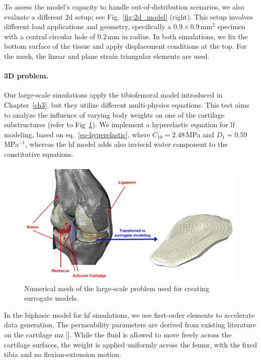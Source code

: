 \documentclass[12pt,a4paper]{report}
\begin{document}
To assess the model's capacity to handle out-of-distribution scenarios, we also evaluate a different \ac{2d} setup; see Fig.~\ref{fig:2d_model} (right). This setup involves different load applications and geometry, specifically a $0.9 \times 0.9$\,mm$^2$ specimen with a central circular hole of $0.2$\,mm in radius. In both simulations, we fix the bottom surface of the tissue and apply displacement conditions at the top. For the mesh, the linear and plane strain triangular elements are used.

\paragraph{3D problem.} Our large-scale simulations apply the tibiofemoral model introduced in Chapter~\ref{ch3}, but they utilize different multi-physics equations. This test aims to analyze the influence of varying body weights on one of the cartilage substructures (refer to Fig~\ref{fig:3d_model}). We implement a hyperelastic equation for \ac{lf} modeling, based on eq.~\ref{eq-hyperelastic}, where $C_{10} = 2.48$\,MPa and $D_1 = 0.59$\,MPa$^{-1}$, whereas the \ac{hf} model adds also inviscid water component to the constitutive equations.
%
\begin{figure}\centering
\includegraphics[width=\linewidth]{3D_model.png}
\caption{Numerical mesh of the large-scale problem used for creating surrogate models.\label{fig:3d_model}}
\end{figure}

In the biphasic model for \ac{hf} simulations, we use first-order elements to accelerate data generation. The permeability parameters are derived from existing literature on the cartilage \ac{mz} [\cite{sajjadinia2019,stender2016}]. While the fluid is allowed to move freely across the cartilage surfaces, the weight is applied uniformly across the femur, with the fixed tibia and no flexion-extension motion.
\end{document}
